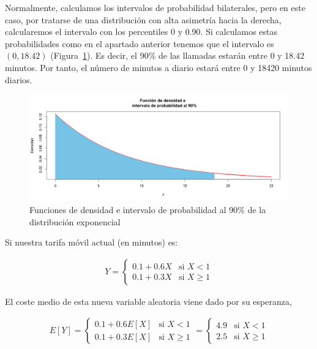 \documentclass[12pt,a4paper,twoside,openright,titlepage,final]{article}
\begin{document}
Normalmente, calculamos los intervalos de probabilidad bilaterales, pero en este caso, por tratarse de una distribución con alta asimetría hacia la derecha, calcularemos el intervalo con los percentiles 0 y 0.90. Si calculamos estas probabilidades como en el apartado anterior tenemos que el intervalo es $(0, 18.42)$ (Figura~\ref{fig:intervalo_probabilidad_exponencial}). Es decir, el 90\% de las llamadas estarán entre 0 y 18.42 minutos. Por tanto, el número de minutos a diario estará entre 0 y 18420 minutos diarios.\\

\begin{figure}[tbph!]
\centering
\includegraphics[width=0.9\linewidth]{imagenes/intervalo_probabilidad_exponencial}
\caption{Funciones de densidad e intervalo de probabilidad al 90\% de la distribución exponencial}
\label{fig:intervalo_probabilidad_exponencial}
\end{figure}

Si nuestra tarifa móvil actual (en minutos) es:

\begin{align*}
Y = \begin{cases}
0.1 + 0.6X & \text{si } X < 1 \\
0.1 + 0.3X & \text{si } X \geq 1
\end{cases}
\end{align*}

El coste medio de esta nueva variable aleatoria viene dado por su esperanza,

\begin{align*}
E[Y] = \begin{cases}
0.1 + 0.6E[X] & \text{si } X < 1 \\
0.1 + 0.3E[X] & \text{si } X \geq 1
\end{cases} = \begin{cases}
4.9 & \text{si } X < 1 \\
2.5 & \text{si } X \geq 1
\end{cases}
\end{align*}
\end{document}
